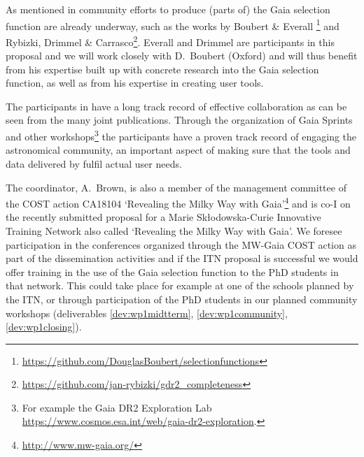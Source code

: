 As mentioned in  community efforts to produce (parts of) the Gaia selection function are already underway, such as the works by Boubert \& Everall \cite{Boubert2020a, Boubert2020b}\footnote{\url{https://github.com/DouglasBoubert/selectionfunctions}} and Rybizki, Drimmel \& Carrasco\footnote{\url{https://github.com/jan-rybizki/gdr2_completeness}}. Everall and Drimmel are participants in this proposal and we will work closely with D.~Boubert (Oxford) and will thus benefit from his expertise built up with concrete research into the Gaia selection function, as well as from his expertise in creating user tools.

The participants in {\acro} have a long track record of effective collaboration as can be seen from the many joint publications. Through the organization of Gaia Sprints and other workshops\footnote{For example the Gaia DR2 Exploration Lab \url{https://www.cosmos.esa.int/web/gaia-dr2-exploration}.} the participants have a proven track record of engaging the astronomical community, an important aspect of making sure that the tools and data delivered by {\acro} fulfil actual user needs.

The coordinator, A.~Brown, is also a member of the management committee of the COST action CA18104 `Revealing the Milky Way with Gaia'\footnote{\url{http://www.mw-gaia.org/}} and is co-I on the recently submitted proposal for a Marie Sk\l{}odowska-Curie Innovative Training Network also called `Revealing the Milky Way with Gaia'. We foresee participation in the conferences organized through the MW-Gaia COST action as part of the dissemination activities and if the ITN proposal is successful we would offer training in the use of the Gaia selection function to the PhD students in that network. This could take place for example at one of the schools planned by the ITN, or through participation of the PhD students in our planned community workshops (deliverables \ref{dev:wp1midtterm}, \ref{dev:wp1community}, \ref{dev:wp1closing}).

